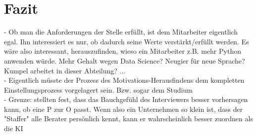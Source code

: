 \section{Fazit}
\label{ch:fazit}
- Ob man die Anforderungen der Stelle erfüllt, ist dem Mitarbeiter eigentlich egal. Ihn interessiert es nur, ob dadurch seine Werte verstärkt/erfüllt werden. Es wäre also interessant, herauszufinden, wieso ein Mitarbeiter z.B. mehr Python anwenden würde. Mehr Gehalt wegen Data Science? Neugier für neue Sprache? Kumpel arbeitet in dieser Abteilung? ... \\
- Eigentlich müsste der Prozess des Motivations-Herausfindens dem kompletten Einstellungsprozess vorgelagert sein. Bzw. sogar dem Studium \\
- Grenze: \textcite{cable:1997} stellten fest, dass das Bauchgefühl des Interviewers besser vorhersagen kann, ob eine P zur O passt. Wenn also ein Unternehmen so klein ist, dass der "Staffer" alle Berater persönlich kennt, kann er wahrscheinlich besser zuordnen als die KI

